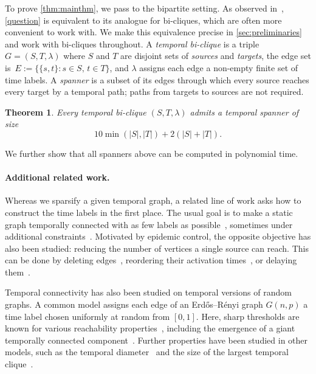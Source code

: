 \documentclass[11pt, letterpaper]{article}
\theoremstyle{definition}
\theoremstyle{plain}
\newtheorem{theorem}[definition]{Theorem}
\begin{document}
To prove \cref{thm:mainthm}, we pass to the bipartite setting.
As observed in~\cite{Angrick24}, \cref{question} is equivalent to its analogue for bi-cliques, which are often more convenient to work with. 
We make this equivalence precise in \cref{sec:preliminaries} and work with bi-cliques throughout.
A \emph{temporal bi-clique} is a triple $G=(S,T,\lambda)$ where $S$ and $T$ are disjoint sets of \emph{sources} and \emph{targets}, the edge set is~$E:=\{\{s,t\}:s\in S,\,t\in T\}$, and $\lambda$ assigns each edge a non-empty finite set of time labels.
A \emph{spanner} is a subset of its edges through which every source reaches every target by a temporal path; paths from targets to sources are not required.

\begin{theorem}
\label{thm:mainthm_biclique}
Every temporal bi-clique $(S,T,\lambda)$ admits a temporal spanner of size
\[10\min(|S|,|T|)+2(|S|+|T|).
\]
\end{theorem}

We further show that all spanners above can be computed in polynomial time.



\paragraph{Additional related work.}
Whereas we sparsify a given temporal graph, a related line of work asks how to construct the time labels in the first place. The usual goal is to make a static graph temporally connected with as few labels as possible~\cite{KlobasMFCS22}, sometimes under additional constraints~\cite{MertziosAlgorithmica19}. Motivated by epidemic control, the opposite objective has also been studied: reducing the number of vertices a single source can reach. This can be done by deleting edges~\cite{EnrightJCSS21}, reordering their activation times~\cite{Enright21Labels}, or delaying them~\cite{MolterMFCS21}. 

Temporal connectivity has also been studied on temporal versions of random graphs. A common model assigns each edge of an Erd\H{o}s--R\'enyi graph $G(n,p)$ a time label chosen uniformly at random from $[0,1]$. Here, sharp thresholds are known for various reachability properties~\cite{CasteigtsRandom}, including the emergence of a giant temporally connected component~\cite{Giantcomponents26}. Further properties have been studied in other models, such as the temporal diameter~\cite{BroutinKL24} and the size of the largest temporal clique~\cite{MertziosDeltaClique24,AtamanchukDL25}.
\end{document}
